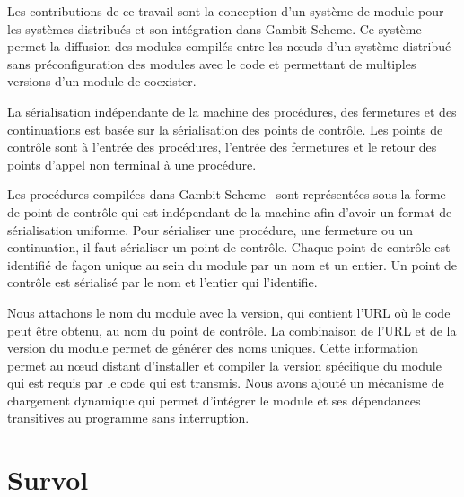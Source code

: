 Les contributions de ce travail sont la conception d'un système de module pour
les systèmes distribués et son intégration dans Gambit Scheme. Ce système
permet la diffusion des modules compilés entre les nœuds d'un système
distribué sans préconfiguration des modules avec le code et permettant
de multiples versions d'un module de coexister.

La sérialisation indépendante de la machine des procédures, des fermetures et
des continuations est basée sur la sérialisation des points de contrôle. Les
points de contrôle sont à l'entrée des procédures, l'entrée des fermetures
et le retour des points d'appel non terminal à une procédure.

Les procédures compilées dans Gambit Scheme~\cite{gambitdoc} sont représentées
sous la forme de point de contrôle qui est indépendant de la machine afin d'avoir
un format de sérialisation uniforme. Pour sérialiser une procédure, une
fermeture ou un continuation, il faut sérialiser un point de contrôle. Chaque
point de contrôle est identifié de façon unique au sein du module par un nom et
un entier. Un point de contrôle est sérialisé par le nom et l'entier qui
l'identifie.

Nous attachons le nom du module avec la version, qui contient l'URL où le code
peut être obtenu, au nom du point de contrôle. La combinaison de l'URL et de la
version du module permet de générer des noms uniques. Cette information permet
au nœud distant d'installer et compiler la version spécifique du module qui est
requis par le code qui est transmis.  Nous avons ajouté un mécanisme de
chargement dynamique qui permet d'intégrer le module et ses dépendances
transitives au programme sans interruption.


\section{Survol}


